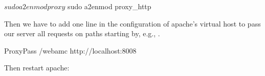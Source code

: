 \begin{bash}
$ sudo a2enmod proxy
$ sudo a2enmod proxy_http
\end{bash}%

Then we have to add one line in the configuration of apache's virtual
host to pass our server all requests on paths starting by, e.g.,
.

\begin{bash}
ProxyPass /webamc http://localhost:8008
\end{bash}

Then restart apache:
